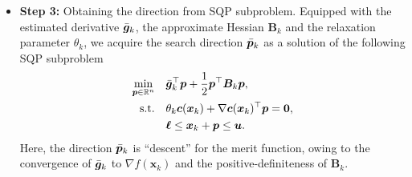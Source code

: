\documentclass[aos]{imsart}
\numberwithin{equation}{section}
\theoremstyle{plain}
\newcommand{\michael}[1]{\textcolor{red}{Michael:\ #1}}
\newcommand{\yihang}[1]{\textcolor{blue}{Yihang:\ #1}}
\begin{document}
\begin{itemize}
It is not difficult to verify that the averaged gradients converge to the exact gradient, at least in expectation, i.e., $ \lim_{k \to \infty} \mathbb{E} \left[ \left\| \Bar{\bm{g}}_k - \nabla f(\bm{x}_k)\right\|_2^2 \right] = 0$, under some mild conditions. However, the simple estimated gradient is not close to the exact gradient, i.e., $\mathbb{E} \left[ \left\|  \bm{g}_k - \nabla f(\bm{x}_k)\right\|_2^2 \right] = \mathcal{O}(1)$.
\michael{Clarify that sentence. I don't know what ``is distinct with the exact gradient as contrast'' means.}
\yihang{I mean the averaged gradient is convergent to the exact gradient but the simple estimated gradient is not.}
\michael{I don't know what ``as contrast'' means.  Also, $\leq \sigma_g^2$ is consistent with being zero, so it could be close.  Do we know that it is not close. Reword.}
\yihang{although it is ``less then'', the noise level does not go to zero, so we may use $\mathcal{O}(1)$? I mean $\mathbb{E} \left[ \left\|  \bm{g}_k - \nabla f(\bm{x}_k)\right\|_2^2 \right]$ is away from 0.}
Without the averaging of derivatives, \cite{curtis2023sequential} achieves global convergence by reducing the noise level manually, by increasing the sample size during the iterations. However, our algorithms (Debiased-StoSQP and its variant Debiased-StoSQP-v2) are still fully stochastic, i.e., the derivative estimate is only required to have bounded variance, and the noise level is reduced by the imposed averaging. 

    \item \textbf{Step 3:} Obtaining the direction from SQP subproblem. Equipped with the estimated derivative $\Bar{\bm{g}}_k$, the approximate Hessian $\bm{B}_k$ and the relaxation parameter $\theta_k$, we acquire the search direction $\Bar{\bm{p}}_k$ as a solution of the following SQP subproblem
    \begin{equation}
    \label{relaxed_sqp_subproblem_stoch}
    \begin{split}
        \min_{\bm{p} \in \mathbb{R}^{n}} & \hspace{1em} \Bar{\bm{g}}_k^{\top}\bm{p}+ \frac{1}{2}\bm{p}^{\top}\bm{B}_k\bm{p},\\
        \text{s.t.} & \hspace{1em} \theta_k \bm{c}(\bm{x}_k)+\nabla \bm{c}(\bm{x}_k)^{\top}\bm{p} = \bm{0},\\
        & \hspace{1em} \bm{\ell} \leq \bm{x}_k + \bm{p} \leq \bm{u}.
    \end{split}    
\end{equation} 
Here, the direction $\Bar{\bm{p}}_k$ is ``descent'' for the merit function, owing to the convergence of  $\Bar{\bm{g}}_k$ to $\nabla f(\bm{x}_k)$ and the positive-definiteness of $\bm{B}_k$. 
    


\end{itemize}
\end{document}
